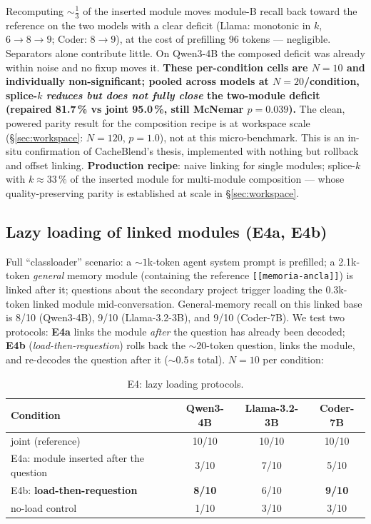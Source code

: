\documentclass[11pt]{article}
\newcommand{\code}[1]{\texttt{#1}}
\begin{document}
Recomputing ${\sim}\tfrac{1}{3}$ of the inserted module moves module-B recall back toward the reference on the two models with a clear deficit (Llama: monotonic in $k$, $6 \to 8 \to 9$; Coder: $8 \to 9$), at the cost of prefilling 96 tokens --- negligible. Separators alone contribute little. On Qwen3-4B the composed deficit was already within noise and no fixup moves it. \textbf{These per-condition cells are $N=10$ and individually non-significant; pooled across models at $N=20$/condition, splice-$k$ \emph{reduces but does not fully close} the two-module deficit (repaired 81.7\,\% vs joint 95.0\,\%, still McNemar $p=0.039$).} The clean, powered parity result for the composition recipe is at workspace scale (\S\ref{sec:workspace}: $N=120$, $p=1.0$), not at this micro-benchmark. This is an in-situ confirmation of CacheBlend's thesis, implemented with nothing but rollback and offset linking. \textbf{Production recipe}: naive linking for single modules; splice-$k$ with $k \approx 33\,\%$ of the inserted module for multi-module composition --- whose quality-preserving parity is established at scale in \S\ref{sec:workspace}.

\subsection{Lazy loading of linked modules (E4a, E4b)}
\label{sec:lazy}

Full ``classloader'' scenario: a ${\sim}1$k-token agent system prompt is prefilled; a 2.1k-token \emph{general} memory module (containing the reference \code{[[memoria-ancla]]}) is linked after it; questions about the secondary project trigger loading the 0.3k-token linked module mid-conversation. General-memory recall on this linked base is 8/10 (Qwen3-4B), 9/10 (Llama-3.2-3B), and 9/10 (Coder-7B). We test two protocols: \textbf{E4a} links the module \emph{after} the question has already been decoded; \textbf{E4b} (\emph{load-then-requestion}) rolls back the ${\sim}20$-token question, links the module, and re-decodes the question after it (${\sim}0.5$\,s total). $N{=}10$ per condition:

\begin{table}[h]
  \centering\small
  \caption{E4: lazy loading protocols.}
  \begin{tabular}{lccc}
    \toprule
    Condition & Qwen3-4B & Llama-3.2-3B & Coder-7B \\
    \midrule
    joint (reference) & 10/10 & 10/10 & 10/10 \\
    E4a: module inserted after the question & 3/10 & 7/10 & 5/10 \\
    E4b: \textbf{load-then-requestion} & \textbf{8/10} & 6/10 & \textbf{9/10} \\
    no-load control & 1/10 & 3/10 & 3/10 \\
    \bottomrule
  \end{tabular}
\end{table}
\end{document}
